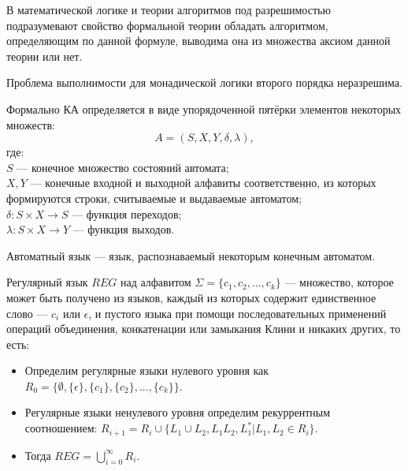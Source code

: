     
    \begin{Def}
        В математической логике и теории алгоритмов под разрешимостью подразумевают свойство формальной теории обладать алгоритмом, определяющим по данной формуле, выводима она из множества аксиом данной теории или нет.
    \end{Def}
    
    \begin{Thm}
        Проблема выполнимости для монадической логики второго порядка неразрешима.
    \end{Thm}
    
    
    
    \begin{Def}
        Формально КА определяется в виде упорядоченной пятёрки элементов некоторых множеств:
        $$ A=(S,X,Y,\delta ,\lambda ),$$
        где:\\
        $S$ --- конечное множество состояний автомата;\\
        $X, Y$ --- конечные входной и выходной алфавиты соответственно, из которых формируются строки, считываемые и выдаваемые автоматом;\\
        $\delta :S\times X\rightarrow S$ --- функция переходов;\\
        $\lambda :S\times X\rightarrow Y$ --- функция выходов.
    \end{Def}
    
    \begin{Def}
        Автоматный язык --- язык, распознаваемый некоторым конечным автоматом.
    \end{Def}
    
    
    \begin{Def}
        Регулярный язык $REG$ над алфавитом $\Sigma = \{c_1, c_2, ...,c_k\}$ — множество, которое может быть получено из языков, каждый из которых содержит единственное слово --- $c_i$ или $\epsilon$, и пустого языка при помощи последовательных применений операций объединения, конкатенации или замыкания Клини и никаких других, то есть:
        \begin{itemize}
            \item Определим регулярные языки нулевого уровня как $R_0 = \{\emptyset, \{\epsilon\}, \{c_1\}, \{c_2\}, ...,\{c_k\}\}$.
            \item Регулярные языки ненулевого уровня определим рекуррентным соотношением: $R_{i + 1} = R_i \cup \{L_1 \cup L_2, L_1L_2, L^*_1 | L_1, L_2 \in R_i\}$.
            \item Тогда $REG = \bigcup_{i = 0}^{\infty} R_i$.
        \end{itemize}   
    \end{Def}
    
